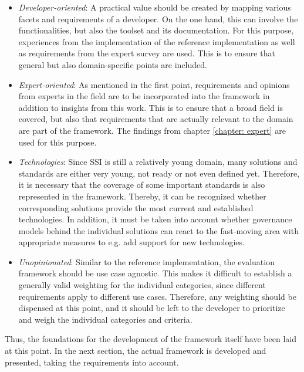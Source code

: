 	\begin{itemize}
	    \item \textit{Developer-oriented}: A practical value should be created by mapping various facets and requirements of a developer. On the one hand, this can involve the functionalities, but also the toolset and its documentation. For this purpose, experiences from the implementation of the reference implementation as well as requirements from the expert survey are used. This is to ensure that general but also domain-specific points are included. %
	    \item \textit{Expert-oriented}: As mentioned in the first point, requirements and opinions from experts in the field are to be incorporated into the framework in addition to insights from this work. This is to ensure that a broad field is covered, but also that requirements that are actually relevant to the domain are part of the framework. The findings from chapter \ref{chapter: expert} are used for this purpose.  %
	    \item \textit{Technologies}: Since \ac{SSI} is still a relatively young domain, many solutions and standards are either very young, not ready or not even defined yet. Therefore, it is necessary that the coverage of some important standards is also represented in the framework. Thereby, it can be recognized whether corresponding solutions provide the most current and established technologies. In addition, it must be taken into account whether governance models behind the individual solutions can react to the fast-moving area with appropriate measures to e.g. add support for new technologies.  %
	    \item \textit{Unopinionated}: Similar to the reference implementation, the evaluation framework should be use case agnostic. This makes it difficult to establish a generally valid weighting for the individual categories, since different requirements apply to different use cases. Therefore, any weighting should be dispensed at this point, and it should be left to the developer to prioritize and weigh the individual categories and criteria.
	\end{itemize}
	
	Thus, the foundations for the development of the framework itself have been laid at this point. In the next section, the actual framework is developed and presented, taking the requirements into account.
	
